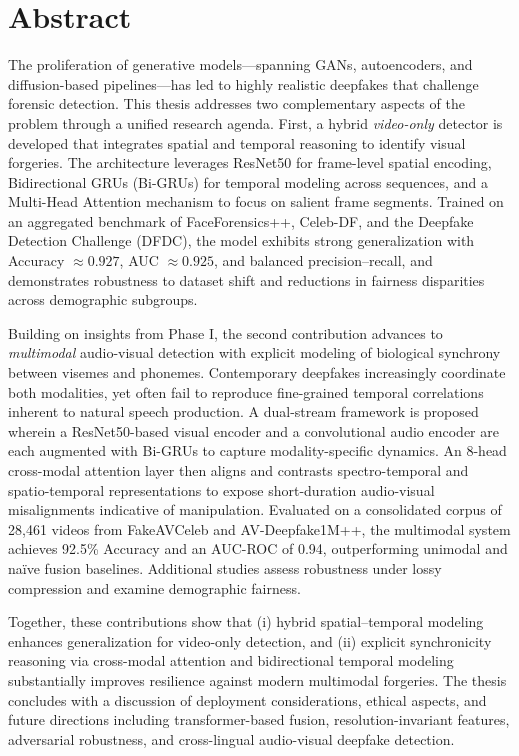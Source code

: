 \documentclass[12pt,oneside,a4paper]{report}
\numberwithin{figure}{chapter}
\numberwithin{table}{chapter}
\begin{document}
\chapter*{Abstract}
The proliferation of generative models—spanning GANs, autoencoders, and diffusion-based pipelines—has led to highly realistic deepfakes that challenge forensic detection. This thesis addresses two complementary aspects of the problem through a unified research agenda. First, a hybrid \textit{video-only} detector is developed that integrates spatial and temporal reasoning to identify visual forgeries. The architecture leverages ResNet50 for frame-level spatial encoding, Bidirectional GRUs (Bi-GRUs) for temporal modeling across sequences, and a Multi-Head Attention mechanism to focus on salient frame segments. Trained on an aggregated benchmark of FaceForensics++, Celeb-DF, and the Deepfake Detection Challenge (DFDC), the model exhibits strong generalization with Accuracy \(\approx 0.927\), AUC \(\approx 0.925\), and balanced precision–recall, and demonstrates robustness to dataset shift and reductions in fairness disparities across demographic subgroups.

Building on insights from Phase I, the second contribution advances to \textit{multimodal} audio-visual detection with explicit modeling of biological synchrony between visemes and phonemes. Contemporary deepfakes increasingly coordinate both modalities, yet often fail to reproduce fine-grained temporal correlations inherent to natural speech production. A dual-stream framework is proposed wherein a ResNet50-based visual encoder and a convolutional audio encoder are each augmented with Bi-GRUs to capture modality-specific dynamics. An 8-head cross-modal attention layer then aligns and contrasts spectro-temporal and spatio-temporal representations to expose short-duration audio-visual misalignments indicative of manipulation. Evaluated on a consolidated corpus of 28{,}461 videos from FakeAVCeleb and AV-Deepfake1M++, the multimodal system achieves 92.5\% Accuracy and an AUC-ROC of 0.94, outperforming unimodal and naïve fusion baselines. Additional studies assess robustness under lossy compression and examine demographic fairness.

Together, these contributions show that (i) hybrid spatial–temporal modeling enhances generalization for video-only detection, and (ii) explicit synchronicity reasoning via cross-modal attention and bidirectional temporal modeling substantially improves resilience against modern multimodal forgeries. The thesis concludes with a discussion of deployment considerations, ethical aspects, and future directions including transformer-based fusion, resolution-invariant features, adversarial robustness, and cross-lingual audio-visual deepfake detection.
\end{document}
